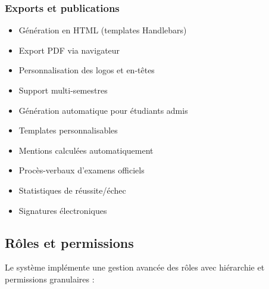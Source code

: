 \subsubsection{Exports et publications}

\begin{description}[leftmargin=3cm, style=nextline]
    \item[Relevés de notes]
    \begin{itemize}
        \item Génération en HTML (templates Handlebars)
        \item Export PDF via navigateur
        \item Personnalisation des logos et en-têtes
        \item Support multi-semestres
    \end{itemize}

    \item[Attestations de réussite]
    \begin{itemize}
        \item Génération automatique pour étudiants admis
        \item Templates personnalisables
        \item Mentions calculées automatiquement
    \end{itemize}

    \item[PV d'examens]
    \begin{itemize}
        \item Procès-verbaux d'examens officiels
        \item Statistiques de réussite/échec
        \item Signatures électroniques
    \end{itemize}
\end{description}

\subsection{Rôles et permissions}

Le système implémente une gestion avancée des rôles avec hiérarchie et permissions granulaires :


